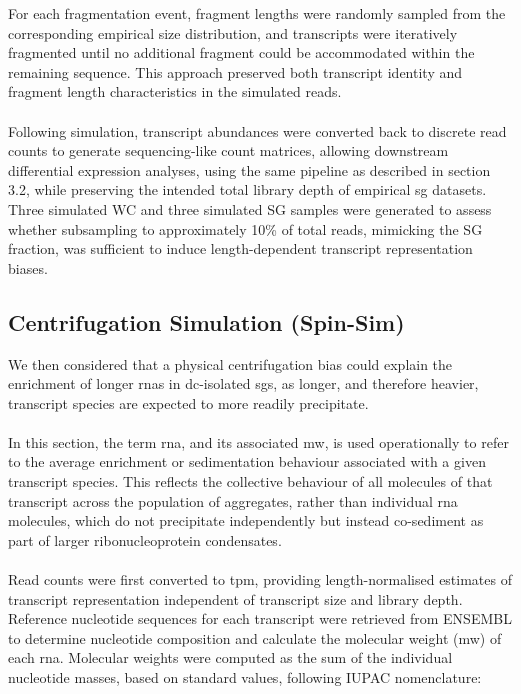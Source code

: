 For each fragmentation event, fragment lengths were randomly sampled from the corresponding empirical size distribution, and transcripts were iteratively fragmented until no additional fragment could be accommodated within the remaining sequence. This approach preserved both transcript identity and fragment length characteristics in the simulated reads.
\\
\\
Following simulation, transcript abundances were converted back to discrete read counts to generate sequencing-like count matrices, allowing downstream differential expression analyses, using the same pipeline as described in section 3.2, while preserving the intended total library depth of empirical \gls{sg} datasets. Three simulated WC and three simulated SG samples were generated to assess whether subsampling to approximately 10\% of total reads, mimicking the SG fraction, was sufficient to induce length-dependent transcript representation biases.


\subsection{Centrifugation Simulation (Spin-Sim)}

We then considered that a physical centrifugation bias could explain the enrichment of longer \gls{rna}s in \gls{dc}-isolated \gls{sg}s, as longer, and therefore heavier, transcript species are expected to more readily precipitate\cite{glauninger_transcriptome-wide_2025}.
\\
\\
In this section, the term \gls{rna}, and its associated \gls{mw}, is used operationally to refer to the average enrichment or sedimentation behaviour associated with a given transcript species. This reflects the collective behaviour of all molecules of that transcript across the population of aggregates, rather than individual \gls{rna} molecules, which do not precipitate independently but instead co-sediment as part of larger ribonucleoprotein condensates\cite{glauninger_transcriptome-wide_2025}.
\\
\\
Read counts were first converted to \gls{tpm}, providing length-normalised estimates of transcript representation independent of transcript size and library depth. Reference nucleotide sequences for each transcript were retrieved from ENSEMBL\cite{cunningham_ensembl_2022} to determine nucleotide composition and calculate the molecular weight (\gls{mw}) of each \gls{rna}. Molecular weights were computed as the sum of the individual nucleotide masses, based on standard values\cite{thermo_fisher_dna_nodate}, following IUPAC nomenclature\cite{noauthor_nomenclature_1985}:

